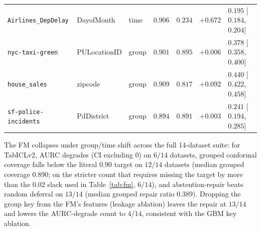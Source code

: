 \documentclass[11pt]{article}
\begin{document}
\begin{table}[h]
\begin{tabular}{lllrrrl}
\texttt{Airlines\_DepDelay}    & DayofMonth          & time  & $0.906$ & $0.234$ & $+0.672$ & $0.195$ [$0.184$, $0.204$] \\
\texttt{nyc-taxi-green}        & PULocationID        & group & $0.901$ & $0.895$ & $+0.006$ & $0.378$ [$0.358$, $0.400$] \\
\texttt{house\_sales}          & zipcode             & group & $0.909$ & $0.817$ & $+0.092$ & $0.440$ [$0.422$, $0.458$] \\
\texttt{sf-police-incidents}   & PdDistrict          & group & $0.894$ & $0.891$ & $+0.003$ & $0.241$ [$0.194$, $0.285$] \\
\bottomrule
\end{tabular}
\end{table}

The FM collapses under group/time shift across the full 14-dataset suite: for TabICLv2, AURC degrades
(CI excluding 0) on $6/14$ datasets, grouped conformal coverage falls below the literal $0.90$ target on
$12/14$ datasets (median grouped coverage $0.890$; on the stricter count that requires missing the target by
more than the $0.02$ slack used in Table~\ref{tab:fm}, $6/14$), and abstention-repair beats random deferral on
$13/14$ (median grouped repair ratio $0.389$). Dropping the group key from the FM's features (leakage ablation)
leaves the repair at $13/14$ and lowers the AURC-degrade count to $4/14$, consistent with the GBM key ablation.
\end{document}
